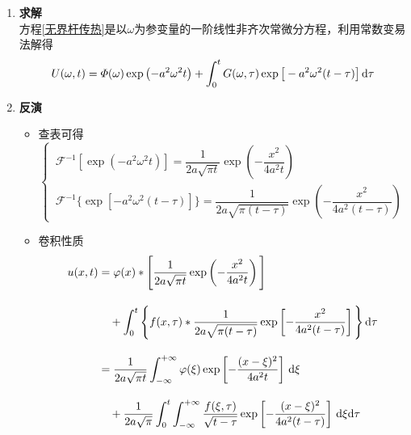\begin{enumerate}
	\item \textbf{求解}\\
	方程\eqref{无界杆传热}是以$\omega$为参变量的一阶线性非齐次常微分方程，利用常数变易法解得
	\begin{equation}
		U(\omega, t) = \varPhi(\omega)\exp\left(-a^2 \omega^2 t\right) + \int_0^t G(\omega ,\tau) \exp \big[-a^2 \omega^2(t - \tau)\big]\, {\rm{d}} \tau
	\end{equation}
	
	\item \textbf{反演}
	\begin{itemize}
		\item 查表可得
		\[
		\begin{cases}
			\, \mathcal{F}^{-1}\left[\exp\left(-a^2 \omega^2 t\right)\right] = \dfrac{1}{2a\sqrt{\pi t}}\exp \left(-\dfrac{x^2}{4a^2t}\right)\\[1em]
			\, \mathcal{F}^{-1}\bigg\lbrace\exp\left[-a^2 \omega^2 (t-\tau)\right]\bigg\rbrace = \dfrac{1}{2a\sqrt{\pi (t-\tau)}}\exp \left(-\dfrac{x^2}{4a^2(t - \tau)}\right)
		\end{cases}
		\]
		
		\item 卷积性质
		\begin{align}
			u(x,t) &= \varphi(x) * \Bigg[\dfrac{1}{2 a \sqrt{\pi t}}\exp\left(-\dfrac{x^2}{4a^2t}\right)\Bigg]\notag \\[1em]
			&\quad +\int_{0}^{t} \Bigg\lbrace f(x, \tau) * \dfrac{1}{2a\sqrt{\pi (t - \tau)}}\exp \left[-\dfrac{x^2}{4a^2(t - \tau)}\right] \Bigg \rbrace \, {\rm{d}} \tau \notag \\[1em]
			& = \dfrac{1}{2a\sqrt{\pi t}}\int_{-\infty}^{+\infty}\varphi(\xi)\exp\left[-\dfrac{(x - \xi)^2}{4a^2t}\right]\, {\rm{d}} \xi \notag\\[1em]
			&\quad + \dfrac{1}{2a \sqrt{\pi}} \int_0^t\int_{-\infty}^{+\infty}\dfrac{f(\xi, \tau)}{\sqrt{t - \tau}} \exp \left[-\dfrac{(x - \xi)^2}{4a^2(t - \tau)}\right]\, {\rm{d}} \xi {\rm{d}} \tau
		\end{align}
	\end{itemize}
\end{enumerate}

